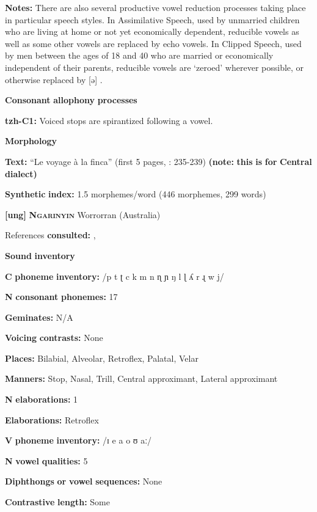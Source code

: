 \begin{styleBody}
\textbf{Notes:} There are also several productive vowel reduction processes taking place in particular speech styles. In Assimilative Speech, used by unmarried children who are living at home or not yet economically dependent, reducible vowels as well as some other vowels are replaced by echo vowels. In Clipped Speech, used by men between the ages of 18 and 40 who are married or economically independent of their parents, reducible vowels are ‘zeroed’ wherever possible, or otherwise replaced by [ə] \citep[26-7]{Kaufman1971}.

\textbf{Consonant} \textbf{allophony} \textbf{processes}

\textbf{tzh-C1:} Voiced stops are spirantized following a vowel. \citep[11]{Kaufman1971}

\textbf{Morphology}

\textbf{Text:} “Le voyage à la finca” (first 5 pages, \citealt{Polian2006}: 235-239) \textbf{(note:} \textbf{this} \textbf{is} \textbf{for} \textbf{Central} \textbf{dialect)}

\textbf{Synthetic} \textbf{index:} 1.5 morphemes/word (446 morphemes, 299 words)

\textbf{[ung]}   \textbf{\textsc{Ngarinyin}}  Worrorran (Australia)

References \textbf{consulted:} \citet{CoateOates1970}, \citet{Rumsey1978}

\textbf{Sound} \textbf{inventory}

\textbf{C} \textbf{phoneme} \textbf{inventory:} /p t ʈ c k m n ɳ ɲ ŋ l ɭ ʎ r ɻ w j/

\textbf{N} \textbf{consonant} \textbf{phonemes:} 17

\textbf{Geminates:} N/A

\textbf{Voicing} \textbf{contrasts:} None

\textbf{Places:} Bilabial, Alveolar, Retroflex, Palatal, Velar

\textbf{Manners:} Stop, Nasal, Trill, Central approximant, Lateral approximant

\textbf{N} \textbf{elaborations:} 1

\textbf{Elaborations:} Retroflex

\textbf{V} \textbf{phoneme} \textbf{inventory:} /ɪ e a o ʊ aː/

\textbf{N} \textbf{vowel} \textbf{qualities:} 5

\textbf{Diphthongs} \textbf{or} \textbf{vowel} \textbf{sequences:} None

\textbf{Contrastive} \textbf{length:} Some


\end{styleBody}
